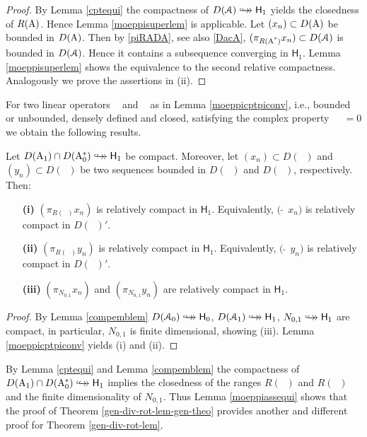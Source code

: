 \documentclass[a4paper]{amsart}
\renewcommand{\H}{\mathsf{H}}
\DeclareMathOperator{\Az}{A_{0}}
\DeclareMathOperator{\Azs}{A_{0}^{*}}
\DeclareMathOperator{\cAz}{\mathcal{A}_{0}}
\DeclareMathOperator{\Ao}{A_{1}}
\DeclareMathOperator{\Aos}{A_{1}^{*}}
\DeclareMathOperator{\cAo}{\mathcal{A}_{1}}
\newcommand{\cptemb}{\hookto\hspace*{-0.85em}\hookto}
\begin{document}
\begin{proof}
By Lemma \ref{cptequi} the compactness of $D(\cA)\cptemb\H_{1}$
yields the closedness of $R(\operatorname{A})$. Hence Lemma \ref{moeppisuperlem} is applicable.
Let $(x_{n})\subset D(\operatorname{A})$ be bounded in $D(\operatorname{A})$.
Then by \eqref{piRADA}, see also \eqref{DacA},
$(\pi_{R(\operatorname{\operatorname{A}^{*}})}x_{n})\subset D(\operatorname{\mathcal{A}})$ is bounded in $D(\operatorname{\mathcal{A}})$.
Hence it contains a subsequence converging in $\H_{1}$.
Lemma \ref{moeppisuperlem} shows the equivalence to the second relative compactness.
Analogously we prove the assertions in (ii).
\end{proof}

For two linear operators $\Az$ and $\Ao$ as in Lemma \ref{moeppicptpiconv}, i.e.,
bounded or unbounded, densely defined and closed,
satisfying the complex property $\Ao\Az=0$ we obtain the following results.

\begin{lem}
Let $D(\Ao)\cap D(\Azs)\cptemb\H_{1}$ be compact.
Moreover, let $(x_{n})\subset D(\Ao)$ and $(y_{n})\subset D(\Azs)$ 
be two sequences bounded in $D(\Ao)$ and $D(\Azs)$, respectively. 
Then:
\begin{itemize}
\item[\bf(i)]
$(\pi_{R(\Aos)}x_{n})$ is relatively compact in $\H_{1}$.
Equivalently, $\big(\widetilde{\Ao}\,x_{n}\big)$ is relatively compact in $D(\Aos)'$.
\item[\bf(ii)]
$(\pi_{R(\Az)}y_{n})$ is relatively compact in $\H_{1}$.
Equivalently, $\big(\widetilde{\Azs}\,y_{n}\big)$ is relatively compact in $D(\Az)'$.
\item[\bf(iii)]
$(\pi_{N_{0,1}}x_{n})$ and $(\pi_{N_{0,1}}y_{n})$ are relatively compact in $\H_{1}$.
\end{itemize}
\end{lem}

\begin{proof}
By Lemma \ref{compemblem} 
$D(\cAz)\cptemb\H_{0}$, $D(\cAo)\cptemb\H_{1}$, $N_{0,1}\cptemb\H_{1}$
are compact, in particular, $N_{0,1}$ is finite dimensional, showing (iii).
Lemma \ref{moeppicptpiconv} yields (i) and (ii).
\end{proof}

\begin{rem}
By Lemma \ref{cptequi} and Lemma \ref{compemblem}  
the compactness of $D(\Ao)\cap D(\Azs)\cptemb\H_{1}$
implies the closedness of the ranges $R(\Az)$ and $R(\Ao)$
and the finite dimensionality of $N_{0,1}$.
Thus Lemma \ref{moeppiassequi} shows that the proof of Theorem \ref{gen-div-rot-lem-gen-theo}
provides another and different proof for Theorem \ref{gen-div-rot-lem}.
\end{rem}
\end{document}
